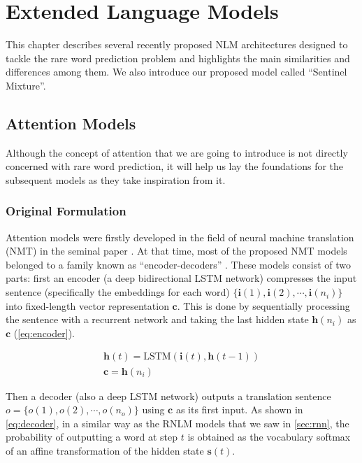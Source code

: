 \chapter{Extended Language Models}

This chapter describes several recently proposed NLM architectures designed to tackle the rare word prediction problem and highlights the main similarities and differences among them. We also introduce our proposed model called ``Sentinel Mixture''.

\section{Attention Models}
\label{sec:attention}

Although the concept of attention that we are going to introduce is not directly concerned with rare word prediction, it will help us lay the foundations for the subsequent models as they take inspiration from it.

\subsection{Original Formulation}

Attention models were firstly developed in the field of neural machine translation (NMT) in the seminal paper \cite{bahdanau2014neural}. At that time, most of the proposed NMT models belonged to a family known as ``encoder-decoders'' \cite{sutskever2014sequence}. These models consist of two parts: first an encoder (a deep bidirectional LSTM network) compresses the input sentence (specifically the embeddings for each word) $\{\mathbf{i}(1), \mathbf{i}(2), \cdots, \mathbf{i}(n_i)\}$ into fixed-length vector representation $\mathbf{c}$. This is done by sequentially processing the sentence with a recurrent network and taking the last hidden state $\mathbf{h}(n_i)$ as $\mathbf{c}$ (\autoref{eq:encoder}).

\begin{equation} \label{eq:encoder}
	\begin{gathered}
		\mathbf{h}(t) = \text{LSTM}(\mathbf{i}(t), \mathbf{h}(t-1)) \\
		\mathbf{c} = \mathbf{h}(n_i)
	\end{gathered}
\end{equation}

Then a decoder (also a deep LSTM network) outputs a translation sentence $o=\{o(1), o(2), \cdots, o(n_o)\}$ using $\mathbf{c}$ as its first input. As shown in \autoref{eq:decoder}, in a similar way as the RNLM models that we saw in \autoref{sec:rnn}, the probability of outputting a word at step $t$ is obtained as the vocabulary softmax of an affine transformation of the hidden state $\mathbf{s}(t)$.

